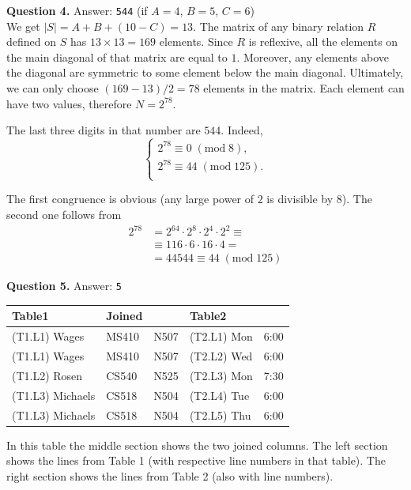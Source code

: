 \documentclass[jou]{apa6}
\begin{document}
\vspace{6pt}
{\bf Question 4.} Answer: {\tt 544} (if $A = 4$, $B = 5$, $C = 6$)\\ 
We get $|S| =  A + B + (10 - C) = 13$. 
The matrix of any binary relation $R$ defined on $S$ has $13 \times 13 = 169$ elements. 
Since $R$ is reflexive, all the elements on the main diagonal of that matrix are equal to $1$. 
Moreover, any elements above the diagonal are symmetric to some element below the main diagonal. 
Ultimately, we can only choose $(169 - 13)/2 = 78$ elements in the matrix. 
Each element can have two values, therefore $N = 2^{78}$. 

The last three digits in that number are $544$. 
Indeed,
$$\left\{ \begin{array}{l}
2^{78} \equiv 0\; (\text{mod}\; 8), \\
2^{78} \equiv 44\;(\text{mod}\; 125). \\
\end{array} \right.$$

The first congruence is obvious (any large power of $2$ is divisible by $8$). 
The second one follows from 
\begin{align}
2^{78} & = 2^{64} \cdot 2^{8} \cdot 2^{4} \cdot 2^{2} \equiv  \nonumber \\
  & \equiv 116 \cdot 6 \cdot 16 \cdot 4 = \nonumber \\
  & = 44544 \equiv 44 \;(\text{mod}\; 125) \nonumber
\end{align}

\vspace{6pt}
{\bf Question 5.} Answer: {\tt 5}\\ 

{\footnotesize
\begin{tabular}{|l||ll||ll|} \hline
{\bf Table1} & {\bf Joined} &  & {\bf Table2} & \\ \hline
(T1.L1) Wages & MS410 & N507 & (T2.L1) Mon & 6:00 \\ \hline
(T1.L1) Wages & MS410 & N507 & (T2.L2) Wed & 6:00 \\ \hline
(T1.L2) Rosen & CS540 & N525 & (T2.L3) Mon & 7:30 \\ \hline
(T1.L3) Michaels & CS518 & N504 & (T2.L4) Tue & 6:00 \\ \hline
(T1.L3) Michaels & CS518 & N504 & (T2.L5) Thu & 6:00 \\ \hline
\end{tabular}
}

In this table the middle section shows the two joined columns. 
The left section shows the lines from Table 1 (with respective line numbers
in that table). The right section shows the lines from Table 2 (also with line numbers). 
\end{document}
